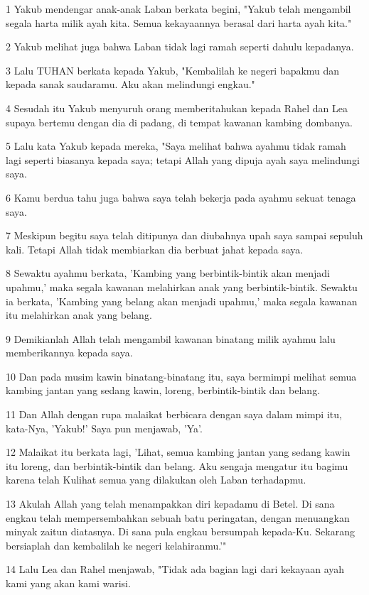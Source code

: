 \par 1 Yakub mendengar anak-anak Laban berkata begini, "Yakub telah mengambil segala harta milik ayah kita. Semua kekayaannya berasal dari harta ayah kita."
\par 2 Yakub melihat juga bahwa Laban tidak lagi ramah seperti dahulu kepadanya.
\par 3 Lalu TUHAN berkata kepada Yakub, "Kembalilah ke negeri bapakmu dan kepada sanak saudaramu. Aku akan melindungi engkau."
\par 4 Sesudah itu Yakub menyuruh orang memberitahukan kepada Rahel dan Lea supaya bertemu dengan dia di padang, di tempat kawanan kambing dombanya.
\par 5 Lalu kata Yakub kepada mereka, "Saya melihat bahwa ayahmu tidak ramah lagi seperti biasanya kepada saya; tetapi Allah yang dipuja ayah saya melindungi saya.
\par 6 Kamu berdua tahu juga bahwa saya telah bekerja pada ayahmu sekuat tenaga saya.
\par 7 Meskipun begitu saya telah ditipunya dan diubahnya upah saya sampai sepuluh kali. Tetapi Allah tidak membiarkan dia berbuat jahat kepada saya.
\par 8 Sewaktu ayahmu berkata, 'Kambing yang berbintik-bintik akan menjadi upahmu,' maka segala kawanan melahirkan anak yang berbintik-bintik. Sewaktu ia berkata, 'Kambing yang belang akan menjadi upahmu,' maka segala kawanan itu melahirkan anak yang belang.
\par 9 Demikianlah Allah telah mengambil kawanan binatang milik ayahmu lalu memberikannya kepada saya.
\par 10 Dan pada musim kawin binatang-binatang itu, saya bermimpi melihat semua kambing jantan yang sedang kawin, loreng, berbintik-bintik dan belang.
\par 11 Dan Allah dengan rupa malaikat berbicara dengan saya dalam mimpi itu, kata-Nya, 'Yakub!' Saya pun menjawab, 'Ya'.
\par 12 Malaikat itu berkata lagi, 'Lihat, semua kambing jantan yang sedang kawin itu loreng, dan berbintik-bintik dan belang. Aku sengaja mengatur itu bagimu karena telah Kulihat semua yang dilakukan oleh Laban terhadapmu.
\par 13 Akulah Allah yang telah menampakkan diri kepadamu di Betel. Di sana engkau telah mempersembahkan sebuah batu peringatan, dengan menuangkan minyak zaitun diatasnya. Di sana pula engkau bersumpah kepada-Ku. Sekarang bersiaplah dan kembalilah ke negeri kelahiranmu.'"
\par 14 Lalu Lea dan Rahel menjawab, "Tidak ada bagian lagi dari kekayaan ayah kami yang akan kami warisi.
